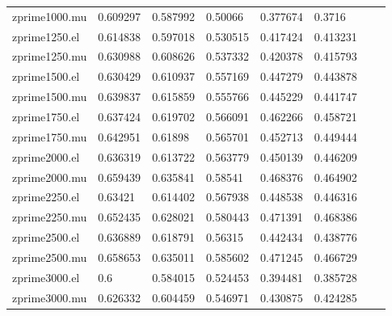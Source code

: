 \begin{table}[H]
\begin{tabular}{l|lllllll}
      zprime1000.mu & 0.609297   & 0.587992   & 0.50066    & 0.377674    & 0.3716      \\
      zprime1250.el & 0.614838   & 0.597018   & 0.530515   & 0.417424    & 0.413231    \\
      zprime1250.mu & 0.630988   & 0.608626   & 0.537332   & 0.420378    & 0.415793    \\
      zprime1500.el & 0.630429   & 0.610937   & 0.557169   & 0.447279    & 0.443878    \\
      zprime1500.mu & 0.639837   & 0.615859   & 0.555766   & 0.445229    & 0.441747    \\
      zprime1750.el & 0.637424   & 0.619702   & 0.566091   & 0.462266    & 0.458721    \\
      zprime1750.mu & 0.642951   & 0.61898    & 0.565701   & 0.452713    & 0.449444    \\
      zprime2000.el & 0.636319   & 0.613722   & 0.563779   & 0.450139    & 0.446209    \\
      zprime2000.mu & 0.659439   & 0.635841   & 0.58541    & 0.468376    & 0.464902    \\
      zprime2250.el & 0.63421    & 0.614402   & 0.567938   & 0.448538    & 0.446316    \\
      zprime2250.mu & 0.652435   & 0.628021   & 0.580443   & 0.471391    & 0.468386    \\
      zprime2500.el & 0.636889   & 0.618791   & 0.56315    & 0.442434    & 0.438776    \\
      zprime2500.mu & 0.658653   & 0.635011   & 0.585602   & 0.471245    & 0.466729    \\
      zprime3000.el & 0.6        & 0.584015   & 0.524453   & 0.394481    & 0.385728    \\
      zprime3000.mu & 0.626332   & 0.604459   & 0.546971   & 0.430875    & 0.424285
    \end{tabular}
    \label{tab:eff_a}

  \end{table}


